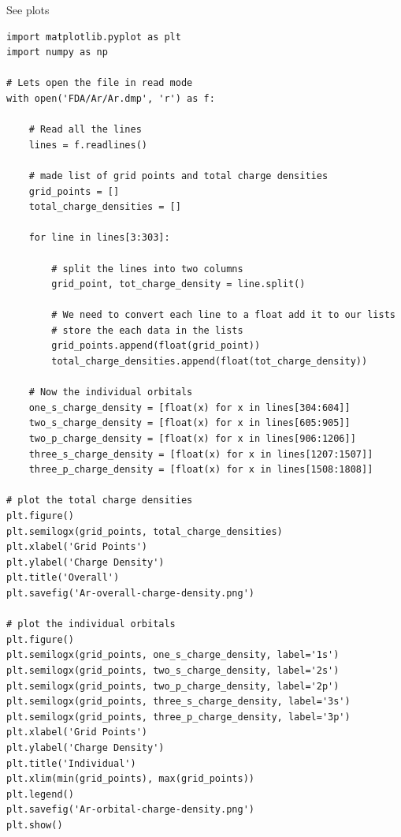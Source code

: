 \documentclass[11pt]{article}
\begin{document}
See plots
\begin{verbatim}
import matplotlib.pyplot as plt
import numpy as np

# Lets open the file in read mode
with open('FDA/Ar/Ar.dmp', 'r') as f:

    # Read all the lines
    lines = f.readlines()

    # made list of grid points and total charge densities
    grid_points = []
    total_charge_densities = []

    for line in lines[3:303]:

        # split the lines into two columns
        grid_point, tot_charge_density = line.split()

        # We need to convert each line to a float add it to our lists
        # store the each data in the lists
        grid_points.append(float(grid_point))
        total_charge_densities.append(float(tot_charge_density))

    # Now the individual orbitals
    one_s_charge_density = [float(x) for x in lines[304:604]]
    two_s_charge_density = [float(x) for x in lines[605:905]]  
    two_p_charge_density = [float(x) for x in lines[906:1206]]
    three_s_charge_density = [float(x) for x in lines[1207:1507]]
    three_p_charge_density = [float(x) for x in lines[1508:1808]]
  
# plot the total charge densities
plt.figure()
plt.semilogx(grid_points, total_charge_densities)
plt.xlabel('Grid Points')
plt.ylabel('Charge Density')
plt.title('Overall')
plt.savefig('Ar-overall-charge-density.png')

# plot the individual orbitals
plt.figure()
plt.semilogx(grid_points, one_s_charge_density, label='1s')
plt.semilogx(grid_points, two_s_charge_density, label='2s')
plt.semilogx(grid_points, two_p_charge_density, label='2p')
plt.semilogx(grid_points, three_s_charge_density, label='3s')
plt.semilogx(grid_points, three_p_charge_density, label='3p')
plt.xlabel('Grid Points')
plt.ylabel('Charge Density')
plt.title('Individual')
plt.xlim(min(grid_points), max(grid_points))
plt.legend()
plt.savefig('Ar-orbital-charge-density.png')
plt.show()
\end{verbatim}
\end{document}
